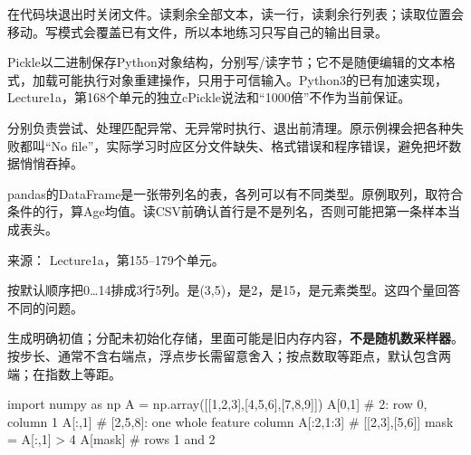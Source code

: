

在代码块退出时关闭文件。读剩余全部文本，读一行，读剩余行列表；读取位置会移动。写模式会覆盖已有文件，所以本地练习只写自己的输出目录。


Pickle以二进制保存Python对象结构，分别写/读字节；它不是随便编辑的文本格式，加载可能执行对象重建操作，只用于可信输入。Python3的已有加速实现，Lecture1a，第168个单元的独立cPickle说法和“1000倍”不作为当前保证。


分别负责尝试、处理匹配异常、无异常时执行、退出前清理。原示例裸会把各种失败都叫“No file”，实际学习时应区分文件缺失、格式错误和程序错误，避免把坏数据悄悄吞掉。


pandas的DataFrame是一张带列名的表，各列可以有不同类型。原例取列，取符合条件的行，算Age均值。读CSV前确认首行是不是列名，否则可能把第一条样本当成表头。


来源： Lecture1a，第155–179个单元。








按默认顺序把0…14排成3行5列。是(3,5)，是2，是15，是元素类型。这四个量回答不同的问题。


生成明确初值；分配未初始化存储，里面可能是旧内存内容，\textbf{不是随机数采样器}。按步长、通常不含右端点，浮点步长需留意舍入；按点数取等距点，默认包含两端；在指数上等距。



\begin{StudyCode}
import numpy as np
A = np.array([[1,2,3],[4,5,6],[7,8,9]])
A[0,1]        # 2: row 0, column 1
A[:,1]        # [2,5,8]: one whole feature column
A[:2,1:3]     # [[2,3],[5,6]]
mask = A[:,1] > 4
A[mask]       # rows 1 and 2
\end{StudyCode}


